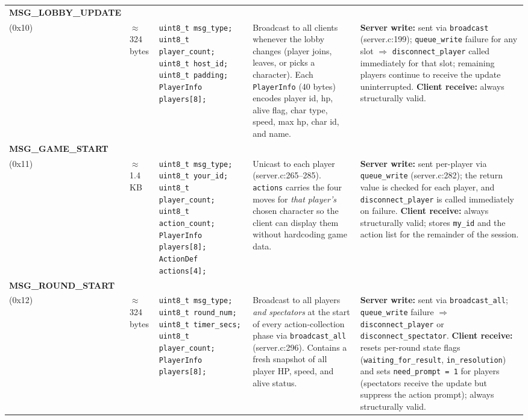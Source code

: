 \documentclass[11pt,letterpaper]{article}
\begin{document}
\begin{longtable}{@{}p{1.8cm} p{1.2cm} p{2.4cm} p{4.2cm} p{4.8cm}@{}}
\textbf{MSG\_LOBBY\_UPDATE}\\(0x10) &
$\approx$324 bytes &
\texttt{uint8\_t msg\_type;}\newline
\texttt{uint8\_t player\_count;}\newline
\texttt{uint8\_t host\_id;}\newline
\texttt{uint8\_t padding;}\newline
\texttt{PlayerInfo players[8];} &
Broadcast to all clients whenever the lobby changes (player joins, leaves, or picks a character). Each \texttt{PlayerInfo} (40 bytes) encodes player id, hp, alive flag, char type, speed, max hp, char id, and name. &
\textbf{Server write:} sent via \texttt{broadcast} (server.c:199); \texttt{queue\_write} failure for any slot $\Rightarrow$ \texttt{disconnect\_player} called immediately for that slot; remaining players continue to receive the update uninterrupted. \textbf{Client receive:} always structurally valid. \\[4pt]
\newpage
\textbf{MSG\_GAME\_START}\\(0x11) &
$\approx$1.4\,KB &
\texttt{uint8\_t msg\_type;}\newline
\texttt{uint8\_t your\_id;}\newline
\texttt{uint8\_t player\_count;}\newline
\texttt{uint8\_t action\_count;}\newline
\texttt{PlayerInfo players[8];}\newline
\texttt{ActionDef actions[4];} &
Unicast to each player (server.c:265--285). \texttt{actions} carries the four moves for \emph{that player's} chosen character so the client can display them without hardcoding game data. &
\textbf{Server write:} sent per-player via \texttt{queue\_write} (server.c:282); the return value is checked for each player, and \texttt{disconnect\_player} is called immediately on failure. \textbf{Client receive:} always structurally valid; stores \texttt{my\_id} and the action list for the remainder of the session. \\[4pt]

\textbf{MSG\_ROUND\_START}\\(0x12) &
$\approx$324 bytes &
\texttt{uint8\_t msg\_type;}\newline
\texttt{uint8\_t round\_num;}\newline
\texttt{uint8\_t timer\_secs;}\newline
\texttt{uint8\_t player\_count;}\newline
\texttt{PlayerInfo players[8];} &
Broadcast to all players \emph{and spectators} at the start of every action-collection phase via \texttt{broadcast\_all} (server.c:296). Contains a fresh snapshot of all player HP, speed, and alive status. &
\textbf{Server write:} sent via \texttt{broadcast\_all}; \texttt{queue\_write} failure $\Rightarrow$ \texttt{disconnect\_player} or \texttt{disconnect\_spectator}. \textbf{Client receive:} resets per-round state flags (\texttt{waiting\_for\_result}, \texttt{in\_resolution}) and sets \texttt{need\_prompt = 1} for players (spectators receive the update but suppress the action prompt); always structurally valid. \\[4pt]


\end{longtable}
\end{document}
